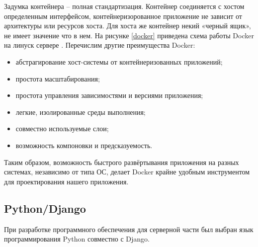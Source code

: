 Задумка контейнера – полная стандартизация. Контейнер соединяется с хостом
определенным интерфейсом, контейнеризорованное приложение не зависит от архитектуры
или ресурсов хоста. Для хоста же контейнер некий «черный ящик», не имеет значение что в нем.
На рисунке \ref{docker} приведена схема работы Docker на линуск сервере \cite{docker}.
Перечислим другие преимущества Docker:

\begin{itemize}
  \item абстрагирование хост-системы от контейнеризованных приложений;
  \item простота масштабирования;
  \item простота управления зависимостями и версиями приложения;
  \item легкие, изолированные среды выполнения;
  \item совместно используемые слои;
  \item возможность компоновки и предсказуемость.
\end{itemize}

Таким образом, возможность быстрого развёртывания приложения на разных системах,
независимо от типа ОС, делает Docker крайне удобным инструментом для проектирования
нашего приложения.


\subsection{Python/Django}

При разработке программного обеспечения для серверной части был выбран
язык программирования Python совместно с Django.

